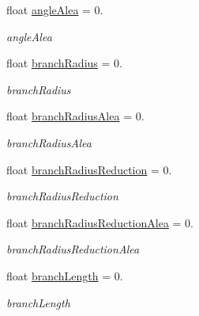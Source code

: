 \begin{DoxyCompactItemize}
float \hyperlink{classLSystem_a11e55d3bb6e352b4e1583f382b43a8a7}{angle\+Alea} = 0.
\begin{DoxyCompactList}\small\item\em angle\+Alea \end{DoxyCompactList}\item 
\mbox{\label{classLSystem_a56efb4f563f724e3e305cf102252e9a9}} 
float \hyperlink{classLSystem_a56efb4f563f724e3e305cf102252e9a9}{branch\+Radius} = 0.
\begin{DoxyCompactList}\small\item\em branch\+Radius \end{DoxyCompactList}\item 
\mbox{\label{classLSystem_ae0935addead7e539c43a681fec7f85b6}} 
float \hyperlink{classLSystem_ae0935addead7e539c43a681fec7f85b6}{branch\+Radius\+Alea} = 0.
\begin{DoxyCompactList}\small\item\em branch\+Radius\+Alea \end{DoxyCompactList}\item 
\mbox{\label{classLSystem_aabea0abccab6d881b0287de79cb67018}} 
float \hyperlink{classLSystem_aabea0abccab6d881b0287de79cb67018}{branch\+Radius\+Reduction} = 0.
\begin{DoxyCompactList}\small\item\em branch\+Radius\+Reduction \end{DoxyCompactList}\item 
\mbox{\label{classLSystem_a66444245d5f7e889dfb54951067b4ca9}} 
float \hyperlink{classLSystem_a66444245d5f7e889dfb54951067b4ca9}{branch\+Radius\+Reduction\+Alea} = 0.
\begin{DoxyCompactList}\small\item\em branch\+Radius\+Reduction\+Alea \end{DoxyCompactList}\item 
\mbox{\label{classLSystem_a770c9b56c5d8abe10ce8240e9b713731}} 
float \hyperlink{classLSystem_a770c9b56c5d8abe10ce8240e9b713731}{branch\+Length} = 0.
\begin{DoxyCompactList}\small\item\em branch\+Length \end{DoxyCompactList}\item 

\end{DoxyCompactItemize}
